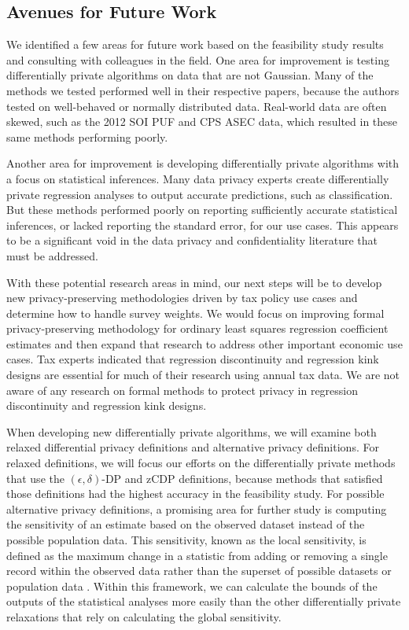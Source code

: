 \subsection{Avenues for Future Work}\label{subsec:future}
We identified a few areas for future work based on the feasibility study results and consulting with colleagues in the field. One area for improvement is testing differentially private algorithms on data that are not Gaussian. Many of the methods we tested performed well in their respective papers, because the authors tested on well-behaved or normally distributed data. Real-world data are often skewed, such as the 2012 SOI PUF and CPS ASEC data, which resulted in these same methods performing poorly.

Another area for improvement is developing differentially private algorithms with a focus on statistical inferences. Many data privacy experts create differentially private regression analyses to output accurate predictions, such as classification. But these methods performed poorly on reporting sufficiently accurate statistical inferences, or lacked reporting the standard error, for our use cases. This appears to be a significant void in the data privacy and confidentiality literature that must be addressed.

With these potential research areas in mind, our next steps will be to develop new privacy-preserving methodologies driven by tax policy use cases and determine how to handle survey weights. We would focus on improving formal privacy-preserving methodology for ordinary least squares regression coefficient estimates and then expand that research to address other important economic use cases. Tax experts indicated that regression discontinuity and regression kink designs are essential for much of their research using annual tax data. We are not aware of any research on formal methods to protect privacy in regression discontinuity and regression kink designs.

When developing new differentially private algorithms, we will examine both relaxed differential privacy definitions and alternative privacy definitions. For relaxed definitions, we will focus our efforts on the differentially private methods that use the $(\epsilon,\delta)$-DP and zCDP definitions, because methods that satisfied those definitions had the highest accuracy in the feasibility study. For possible alternative privacy definitions, a promising area for further study is computing the sensitivity of an estimate based on the observed dataset instead of the possible population data. This sensitivity, known as the local sensitivity, is defined as the maximum change in a statistic from adding or removing a single record within the observed data rather than the superset of possible datasets or population data \citep{nissim2007smooth}. Within this framework, we can calculate the bounds of the outputs of the statistical analyses more easily than the other differentially private relaxations that rely on calculating the global sensitivity.

